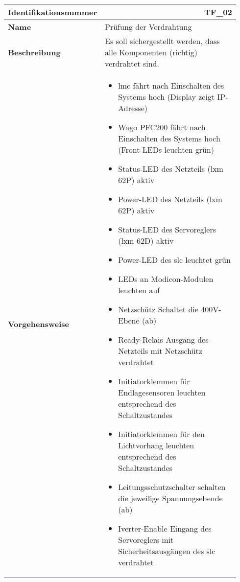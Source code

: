 \documentclass[../../../Bachelorarbeit.tex]{subfiles}
\begin{document}
\begin{table}[H]
    \centering
    \begin{tabular}{ p{0.34\linewidth}  p{0.6\linewidth} }
        \hline
        \textbf{Identifikationsnummer}  & \multicolumn{1}{r}{TF\_02} \\ \hline
        \textbf{Name}                   & Prüfung der Verdrahtung \\
        \textbf{Beschreibung}           & Es soll sichergestellt werden, dass alle Komponenten (richtig) verdrahtet sind. \\
        \textbf{Vorgehensweise}         &   {\begin{itemize}[noitemsep,topsep=0pt,parsep=0pt,partopsep=0pt,leftmargin=*]
                                                \item \acs{lmc} fährt nach Einschalten des Systems hoch (Display zeigt IP-Adresse)
                                                \item Wago PFC200 fährt nach Einschalten des Systems hoch (Front-LEDs leuchten grün)
                                                \item Status-LED des Netzteils (\acs{lxm} 62P) aktiv
                                                \item Power-LED des Netzteils (\acs{lxm} 62P) aktiv
                                                \item Status-LED des Servoreglers (\acs{lxm} 62D) aktiv
                                                \item Power-LED des \acs{slc} leuchtet grün
                                                \item LEDs an Modicon-Modulen leuchten auf
                                                \item Netzschütz Schaltet die 400V-Ebene (ab)
                                                \item Ready-Relais Ausgang des Netzteils mit Netzschütz verdrahtet
                                                \item Initiatorklemmen für Endlagesensoren leuchten entsprechend des Schaltzustandes
                                                \item Initiatorklemmen für den Lichtvorhang leuchten entsprechend des Schaltzustandes
                                                \item Leitungsschutzschalter schalten die jeweilige Spannungsebende (ab)
                                                \item Iverter-Enable Eingang des Servoreglers mit Sicherheitsausgängen des \acs{slc} verdrahtet

\end{itemize}}
\end{tabular}
\end{table}
\end{document}
